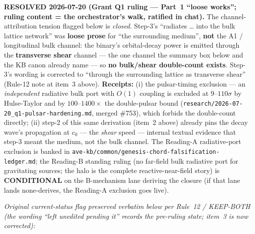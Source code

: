 \begin{warningbox}
\textbf{RESOLVED 2026-07-20 (Grant Q1 ruling --- Part~1 ``loose works''; ruling content = the
orchestrator's walk, ratified in chat).} The channel-attribution tension flagged below is
\emph{closed}. Step-3's ``radiates \ldots{} into the bulk lattice network'' was \textbf{loose
prose} for ``the surrounding medium'', \textbf{not} the A1 / longitudinal bulk channel: the
binary's orbital-decay power is emitted through the \textbf{transverse shear} channel --- the
one channel the summary box below and the KB canon already name --- so \textbf{no bulk/shear
double-count exists}. Step-3's wording is corrected to ``through the surrounding lattice as
transverse shear'' (Rule-12 note at item~3 above). \textbf{Receipts:} (i) the pulsar-timing
exclusion --- an \emph{independent} radiative bulk port with $O(1)$ coupling is excluded at
$9$--$110\sigma$ by Hulse-Taylor and by $100$--$1400\times$ the double-pulsar bound
(\texttt{research/2026-07-20\_q1-pulsar-hardening.md}, merged \#753), which forbids the
double-count directly; (ii) step-2 of this same derivation (item~2 above) already pins the
decay wave's propagation at $c_0$ --- the \emph{shear} speed --- internal textual evidence
that step-3 meant the medium, not the bulk channel. The Reading-A radiative-port exclusion is
banked in \texttt{ave-kb/common/genesis-chord-falsification-ledger.md}; the Reading-B
standing ruling (no far-field bulk radiative port for gravitating sources; the halo is the
complete reactive-near-field story) is \textbf{CONDITIONAL} on the B-mechanism lane deriving
the closure (if that lane lands none-derives, the Reading-A exclusion goes live).

\medskip
\noindent\emph{Original current-status flag preserved verbatim below per Rule~12 / KEEP-BOTH
(the wording ``left unedited pending it'' records the pre-ruling state; item~3 is now
corrected):}


\end{warningbox}
